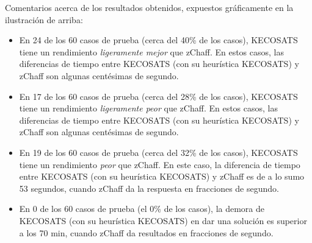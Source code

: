 \documentclass[12pt,lettersize,oneside]{article}
\begin{document}
Comentarios acerca de los resultados obtenidos, expuestos gráficamente en la
ilustración de arriba:\vspace{-2.5mm}
\begin{itemize}
\item En 24 de los 60 casos de prueba (cerca del 40\% de los casos), KECOSATS
  tiene un rendimiento \emph{ligeramente mejor} que zChaff. En estos casos, las
  diferencias de tiempo entre KECOSATS (con su heurística KECOSATS) y zChaff son
  algunas centésimas de segundo.
\item En 17 de los 60 casos de prueba (cerca del 28\% de los casos), KECOSATS
  tiene un rendimiento \emph{ligeramente peor} que zChaff. En estos casos, las
  diferencias de tiempo entre KECOSATS (con su heurística KECOSATS) y zChaff son
  algunas centésimas de segundo.
\item En 19 de los 60 casos de prueba (cerca del 32\% de los casos), KECOSATS
  tiene un rendimiento \emph{peor} que zChaff. En este caso, la diferencia de
  tiempo entre KECOSATS (con su heurística KECOSATS) y zChaff es de a lo sumo 53
  segundos, cuando zChaff da la respuesta en fracciones de segundo.
\item En 0 de los 60 casos de prueba (el 0\% de los casos), la demora de
  KECOSATS (con su heurística KECOSATS) en dar una solución es superior a los 70
  min, cuando zChaff da resultados en fracciones de segundo.
\end{itemize}


\end{document}
